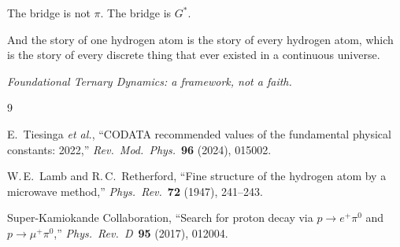 \documentclass[11pt,a4paper]{article}
\newcommand{\Gstar}{G^{*}}
\begin{document}
The bridge is not $\pi$.  The bridge is $\Gstar$.

And the story of one hydrogen atom is the story of every hydrogen atom,
which is the story of every discrete thing that ever existed in a continuous
universe.

\bigskip
\begin{center}\itshape
Foundational Ternary Dynamics: a framework, not a faith.
\end{center}

\begin{thebibliography}{9}

E.~Tiesinga \textit{et al.},
``CODATA recommended values of the fundamental physical constants: 2022,''
\textit{Rev.\ Mod.\ Phys.}\ \textbf{96} (2024), 015002.

W.\,E.~Lamb and R.\,C.~Retherford,
``Fine structure of the hydrogen atom by a microwave method,''
\textit{Phys.\ Rev.}\ \textbf{72} (1947), 241--243.

Super-Kamiokande Collaboration,
``Search for proton decay via $p\to e^+\pi^0$ and $p\to\mu^+\pi^0$,''
\textit{Phys.\ Rev.\ D}\ \textbf{95} (2017), 012004.

\end{thebibliography}
\end{document}
